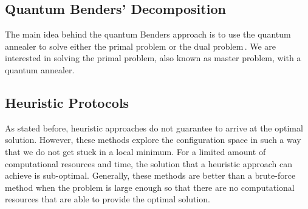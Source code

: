 \subsection{Quantum Benders' Decomposition}
The main idea behind the quantum Benders approach is to use the quantum annealer to solve either the primal problem or the dual problem\,\cite{Zhao2021HybridProgramming}. We are interested in solving the primal problem, also known as master problem, with a quantum annealer. 
\subsection{Heuristic Protocols}
As stated before, heuristic approaches do not guarantee to arrive at the optimal solution. However, these methods explore the configuration space in such a way that we do not get stuck in a local minimum. For a limited amount of computational resources and time, the solution that a heuristic approach can achieve is sub-optimal. Generally, these methods are better than a brute-force method when the problem is large enough so that there are no computational resources that are able to provide the optimal solution.

